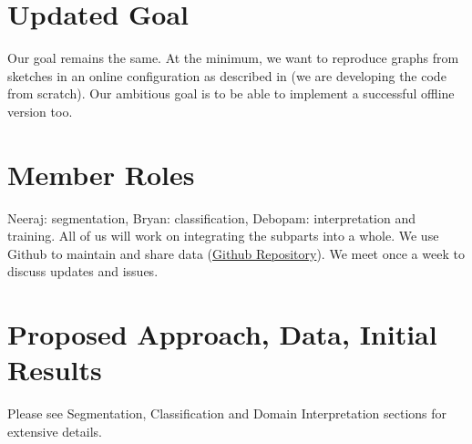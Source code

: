 \section{Updated Goal}

Our goal remains the same. At the minimum, we want to reproduce graphs from sketches in an online configuration as described in \citeauthor{daly2015hand} \cite{daly2015hand} (we are developing the code from scratch). Our ambitious goal is to be able to implement a successful offline version too.\\

\section{Member Roles}

Neeraj: segmentation, Bryan: classification, Debopam: interpretation and training. All of us will work on integrating the subparts into a whole. We use Github to maintain and share data (\href{https://github.com/neerajgangwar/graph-recognition}{Github Repository}). We meet once a week to discuss updates and issues.

\section{Proposed Approach, Data, Initial Results}

Please see Segmentation, Classification and Domain Interpretation sections for extensive details.

